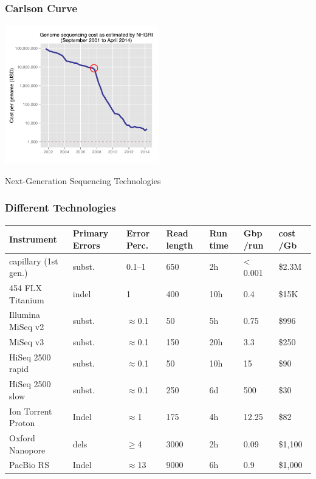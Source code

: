 \begin{frame}\frametitle{Carlson Curve}
\includegraphics[width=6.7cm]{Historic_cost_of_sequencing_a_human_genome2.pdf}

\small
Next-Generation Sequencing Technologies
\end{frame}

\begin{frame}\frametitle{Different Technologies}


\small
\begin{tabular}{|p{8em}|p{3em}|p{2em}|p{2.2em}|p{1.9em}|p{1.8em}|p{2.3em}|}
\hline
Instrument&Primary Errors&Error Perc.&Read length&Run time&Gbp /run&cost /Gb\\
\hline
capillary (1st gen.)&subst.&0.1--1&650&2h&< 0.001&\$2.3M\\
\hline
454 FLX Titanium&indel&1&400&10h&0.4&\$15K\\
\hline
Illumina MiSeq v2&subst.&$\approx$0.1&50&5h&0.75&\$996\\
\hline
MiSeq v3&subst.&$\approx$0.1&150&20h&3.3&\$250\\
\hline
HiSeq 2500 rapid&subst.&$\approx$0.1&50&10h&15&\$90\\
\hline
HiSeq 2500 slow
&subst.&$\approx$0.1&250&6d&500&\$30\\
\hline
Ion Torrent Proton&Indel&$\approx$1&175&4h&12.25&\$82\\
\hline
Oxford Nanopore&dels&$\ge$4&3000&2h&0.09&\$1,100\\
\hline
PacBio RS&Indel&$\approx$13&9000&6h&0.9&\$1,000\\
\hline
\end{tabular}
\end{frame}



